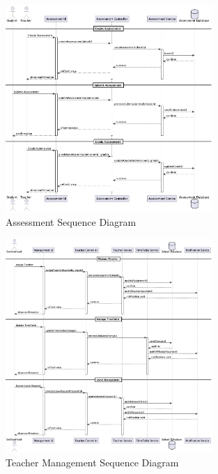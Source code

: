 \documentclass[12pt,a4paper]{report}
\begin{document}
\begin{figure}[htbp]
    \centering
    \includegraphics[width=0.7\textwidth]{assessment-sequence.png}
    \caption{Assessment Sequence Diagram}
    \label{fig:assessment-sequence}
\end{figure}

\begin{figure}[htbp]
    \centering
    \includegraphics[width=0.7\textwidth]{teacher-sequence.png}
    \caption{Teacher Management Sequence Diagram}
    \label{fig:teacher-sequence}
\end{figure}
\end{document}
